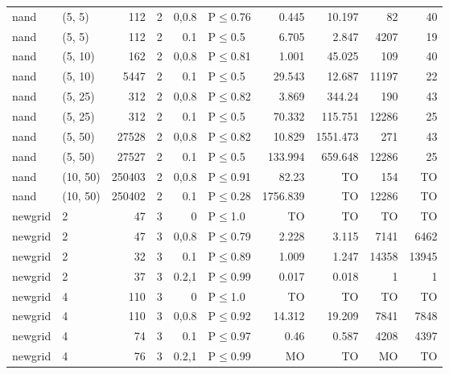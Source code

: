 \begin{longtable}{llrrrlrrrr}
 nand          & (5, 5)   &    	112 &   2 & 0,0.8 & P$\leq$0.76  & 0.445    & 10.197   & 82      & 40      \\
 nand          & (5, 5)   &    	112 &   2 & 0.1   & P$\leq$0.5   & 6.705    & 2.847    & 4207    & 19      \\
 nand          & (5, 10)  &    	162 &   2 & 0,0.8 & P$\leq$0.81  & 1.001    & 45.025   & 109     & 40      \\
 nand          & (5, 10)  &   	5447 &   2 & 0.1   & P$\leq$0.5   & 29.543   & 12.687   & 11197   & 22      \\
 nand          & (5, 25)  &    	312 &   2 & 0,0.8 & P$\leq$0.82  & 3.869    & 344.24   & 190     & 43      \\
 nand          & (5, 25)  &    	312 &   2 & 0.1   & P$\leq$0.5   & 70.332   & 115.751  & 12286   & 25      \\
 nand          & (5, 50)  &  	27528 &   2 & 0,0.8 & P$\leq$0.82  & 10.829   & 1551.473 & 271     & 43      \\
 nand          & (5, 50)  &  	27527 &   2 & 0.1   & P$\leq$0.5   & 133.994  & 659.648  & 12286   & 25      \\
 nand          & (10, 50) & 	250403 &   2 & 0,0.8 & P$\leq$0.91  & 82.23    & TO       & 154     & TO      \\
 nand          & (10, 50) & 	250402 &   2 & 0.1   & P$\leq$0.28  & 1756.839 & TO       & 12286   & TO      \\
 newgrid       & 2        &     	47 &   3 & 0     & P$\leq$1.0   & TO       & TO       & TO      & TO      \\
 newgrid       & 2        &     	47 &   3 & 0,0.8 & P$\leq$0.79  & 2.228    & 3.115    & 7141    & 6462    \\
 newgrid       & 2        &     	32 &   3 & 0.1   & P$\leq$0.89  & 1.009    & 1.247    & 14358   & 13945   \\
 newgrid       & 2        &     	37 &   3 & 0.2,1 & P$\leq$0.99  & 0.017    & 0.018    & 1       & 1       \\
 newgrid       & 4        &    	110 &   3 & 0     & P$\leq$1.0   & TO       & TO       & TO      & TO      \\
 newgrid       & 4        &    	110 &   3 & 0,0.8 & P$\leq$0.92  & 14.312   & 19.209   & 7841    & 7848    \\
 newgrid       & 4        &     	74 &   3 & 0.1   & P$\leq$0.97  & 0.46     & 0.587    & 4208    & 4397    \\
 newgrid       & 4        &     	76 &   3 & 0.2,1 & P$\leq$0.99  & MO       & TO       & MO      & TO      \\

\end{longtable}
